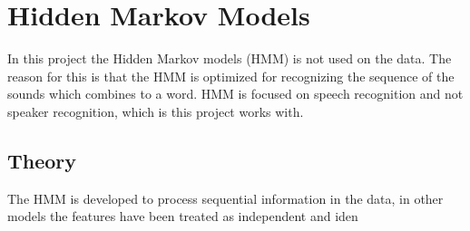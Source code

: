 \chapter{Hidden Markov Models}
In this project the Hidden Markov models (HMM) is not used on the data.
The reason for this is that the HMM is optimized for recognizing the sequence of the sounds which combines to a word.
HMM is focused on speech recognition and not speaker recognition, which is this project works with.

\section{Theory}   
The HMM is developed to process sequential information in the data, in other models the features have been treated as independent and iden   